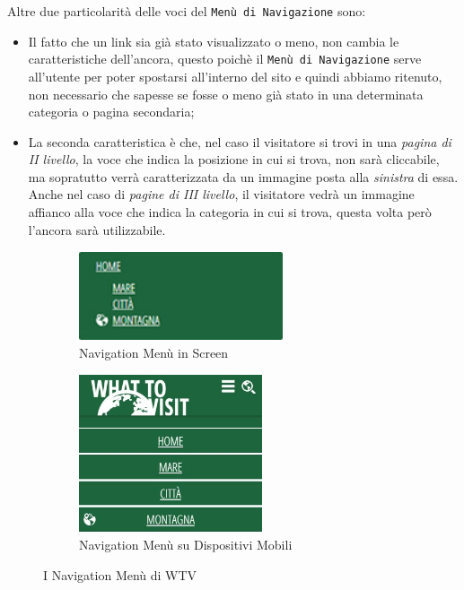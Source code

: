 Altre due particolarità delle voci del \texttt{Menù di Navigazione} sono:
\begin{itemize}
\item Il fatto che un link sia già stato visualizzato o meno, non cambia le caratteristiche dell'ancora, questo poichè il \texttt{Menù di Navigazione} serve all'utente per poter spostarsi all'interno del sito e quindi abbiamo ritenuto, non necessario che sapesse se fosse o meno già stato in una determinata categoria o pagina secondaria;
\item La seconda caratteristica è che, nel caso il visitatore si trovi in una \textit{pagina di II livello}, la voce che indica la posizione in cui si trova, non sarà cliccabile, ma sopratutto verrà caratterizzata da un immagine posta alla \textit{sinistra} di essa. Anche nel caso di \textit{pagine di III livello}, il visitatore vedrà un immagine affianco alla voce che indica la categoria in cui si trova, questa volta però l'ancora sarà utilizzabile.
\end{itemize}
\begin{figure}[h!]
        \centering
        \begin{subfigure}[b]{0.3\textwidth}
                \includegraphics[height=2.63cm,width=6cm]{images/pres_nav.jpg}
                \caption{Navigation Menù in Screen}
                \label{fig:Nav-screen}
        \end{subfigure}
        \hspace{4cm}
        \begin{subfigure}[b]{0.3\textwidth}
                \includegraphics[height=4.65cm,width=5.4cm]{images/pres_nav_m.jpg}
                \caption{Navigation Menù su Dispositivi Mobili}
                \label{fig:Nav-mobile}
        \end{subfigure}
        \caption{I Navigation Menù di WTV}\label{fig:Display-Nav}
\end{figure}

